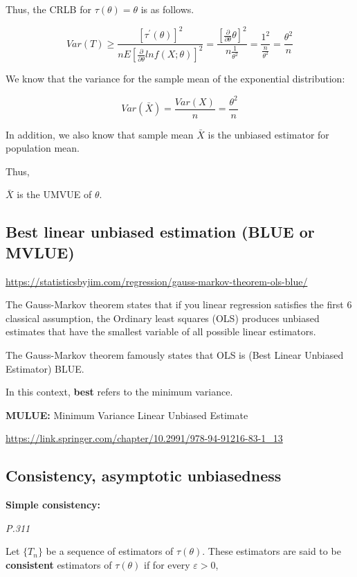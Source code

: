 \documentclass[]{book}
\begin{document}
Thus, the CRLB for \(\tau(\theta)=\theta\) is as follows.

\[Var(T) \geq \frac{[\tau^{'}(\theta)]^2}{nE[\frac{\partial}{\partial \theta} ln f(X; \theta)]^2}=\frac{[\frac{\partial }{\partial \theta}\theta]^2}{n \frac{1}{\theta^2}}=\frac{1^2}{\frac{n}{\theta^2}}=\frac{\theta^2}{n}\]

We know that the variance for the sample mean of the exponential distribution:

\[Var(\bar{X})=\frac{Var(X)}{n}=\frac{\theta^2}{n}\]

In addition, we also know that sample mean \(\bar{X}\) is the unbiased estimator for population mean.

Thus,

\(\bar{X}\) is the UMVUE of \(\theta\).

\hypertarget{best-linear-unbiased-estimation-blue-or-mvlue}{%
\subsection{Best linear unbiased estimation (BLUE or MVLUE)}\label{best-linear-unbiased-estimation-blue-or-mvlue}}

\url{https://statisticsbyjim.com/regression/gauss-markov-theorem-ols-blue/}

The Gauss-Markov theorem states that if you linear regression satisfies the first 6 classical assumption, the Ordinary least squares (OLS) produces unbiased estimates that have the smallest variable of all possible linear estimators.

The Gauss-Markov theorem famously states that OLS is (Best Linear Unbiased Estimator) BLUE.

In this context, \textbf{best} refers to the minimum variance.

\textbf{MULUE:} Minimum Variance Linear Unbiased Estimate

\url{https://link.springer.com/chapter/10.2991/978-94-91216-83-1_13}

\hypertarget{consistency-asymptotic-unbiasedness}{%
\subsection{Consistency, asymptotic unbiasedness}\label{consistency-asymptotic-unbiasedness}}

\textbf{Simple consistency:}

\emph{P.311}

Let \(\{T_n\}\) be a sequence of estimators of \(\tau(\theta)\). These estimators are said to be \textbf{consistent} estimators of \(\tau(\theta)\) if for every \(\varepsilon >0\),
\end{document}

